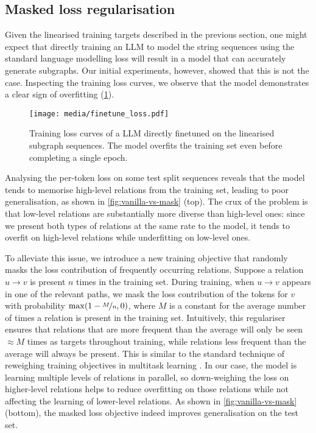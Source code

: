 \subsection{Masked loss regularisation}  \label{sec:method:masked-loss}

Given the linearised training targets described in the previous section, one might expect that directly training an LLM to model the string sequences using the standard language modelling loss will result in a model that can accurately generate subgraphs. Our initial experiments, however, showed that this is not the case. Inspecting the training loss curves, we observe that the model demonstrates a clear sign of overfitting (\cref{fig:vanilla-loss-curves}).

\begin{figure}
    \centering
    \texttt{[image: media/finetune\_loss.pdf]}
    \captionsetup{width=0.6\linewidth}
    \caption{Training loss curves of a LLM directly finetuned on the linearised subgraph sequences. The model overfits the training set even before completing a single epoch.}
    \label{fig:vanilla-loss-curves}
\end{figure}

Analysing the per-token loss on some test split sequences reveals that the model tends to memorise high-level relations from the training set, leading to poor generalisation, as shown in \cref{fig:vanilla-vs-mask} (top). The crux of the problem is that low-level relations are substantially more diverse than high-level ones: since we present both types of relations at the same rate to the model, it tends to overfit on high-level relations while underfitting on low-level ones.



To alleviate this issue, we introduce a new training objective that randomly masks the loss contribution of frequently occurring relations. Suppose a relation $u \to v$ is present $n$ times in the training set. During training, when $u \to v$ appears in one of the relevant paths, we mask the loss contribution of the tokens for $v$ with probability $\max(1 - \nicefrac{M}{n}, 0)$, where $M$ is a constant for the average number of times a relation is present in the training set. Intuitively, this regulariser ensures that relations that are more frequent than the average will only be seen $\approx\!M$ times as targets throughout training, while relations less frequent than the average will always be present. This is similar to the standard technique of reweighing training objectives in multitask learning \cite{caruana1997multitask}. In our case, the model is learning multiple levels of relations in parallel, so down-weighing the loss on higher-level relations helps to reduce overfitting on those relations while not affecting the learning of lower-level relations. As shown in \cref{fig:vanilla-vs-mask} (bottom), the masked loss objective indeed improves generalisation on the test set.

